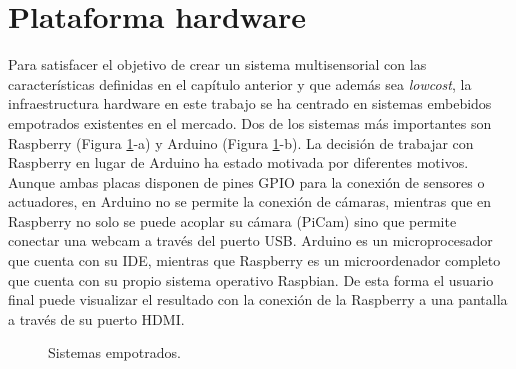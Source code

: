 \section{Plataforma hardware}
\label{sec:hw}
Para satisfacer el objetivo de crear un sistema multisensorial con las características definidas en el capítulo anterior y que además sea \textit{lowcost}, la infraestructura hardware en este trabajo se ha centrado en sistemas embebidos empotrados existentes en el mercado. Dos de los sistemas más importantes son Raspberry (Figura \ref{fig:placas}-a) y Arduino (Figura \ref{fig:placas}-b). La decisión de trabajar con Raspberry en lugar de Arduino ha estado motivada por diferentes motivos. Aunque ambas placas disponen de pines GPIO para la conexión de sensores o actuadores, en Arduino no se permite la conexión de cámaras, mientras que en Raspberry no solo se puede acoplar su cámara (PiCam) sino que permite conectar una webcam a través del puerto USB. Arduino es un microprocesador que cuenta con su IDE, mientras que Raspberry es un microordenador completo que cuenta con su propio sistema operativo Raspbian. De esta forma el usuario final puede visualizar el resultado con la conexión de la Raspberry a una pantalla a través de su puerto HDMI.\\
\begin{figure}[h!]
  \begin{center}
    \hspace{2mm}
  \end{center}
\caption{Sistemas empotrados.} \label{fig:placas}
\end{figure}

